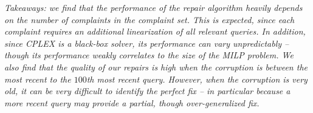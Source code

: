 {\it Takeaways: we find that the performance of the repair algorithm heavily depends on the 
number of complaints in the complaint set.  This is expected, since each complaint requires 
an additional linearization of all relevant queries.  In addition, since CPLEX is a black-box
solver, its performance can vary unpredictably -- though its performance weakly correlates to the 
size of the MILP problem.  We also find that the quality of our repairs 
is high when the corruption is between the most recent to the $100$th most recent query.  However,
when the corruption is very old, it can be very difficult to identify the perfect fix -- 
in particular because a more recent query may provide a partial, though over-generalized fix.}















